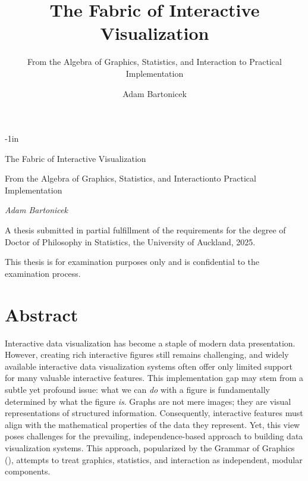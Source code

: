 \documentclass[
  openany]{book}
\title{The Fabric of Interactive Visualization}
\subtitle{From the Algebra of Graphics, Statistics, and Interaction to Practical Implementation}
\author{Adam Bartonicek}
\date{}
\theoremstyle{definition}
\theoremstyle{definition}
\theoremstyle{definition}
\theoremstyle{definition}
\theoremstyle{remark}
\begin{document}
\maketitle

\begin{adjustwidth}{}{-1in}

\thispagestyle{empty}

\begin{center}

\vspace*{5\baselineskip}

{\huge The Fabric of Interactive Visualization \par}

\vspace*{1\baselineskip}

\large{From the Algebra of Graphics, Statistics, and Interaction\break to Practical Implementation}

\vspace*{2\baselineskip}

\large{\textit{Adam Bartonicek}}

\vspace*{16\baselineskip}

\begin{minipage}{0.8\linewidth}

\normalsize{A thesis submitted in partial fulfillment of the requirements for the degree of Doctor of Philosophy in Statistics, the University of Auckland, 2025.}

\vspace*{2\baselineskip}

\normalsize{This thesis is for examination purposes only and is confidential to the examination process.}

\end{minipage}

\end{center}

\end{adjustwidth}

\chapter{Abstract}\label{abstract}

Interactive data visualization has become a staple of modern data presentation. However, creating rich interactive figures still remains challenging, and widely available interactive data visualization systems often offer only limited support for many valuable interactive features. This implementation gap may stem from a subtle yet profound issue: what we can \emph{do} with a figure is fundamentally determined by what the figure \emph{is}. Graphs are not mere images; they are visual representations of structured information. Consequently, interactive features must align with the mathematical properties of the data they represent. Yet, this view poses challenges for the prevailing, independence-based approach to building data visualization systems. This approach, popularized by the Grammar of Graphics (), attempts to treat graphics, statistics, and interaction as independent, modular components.
\end{document}
